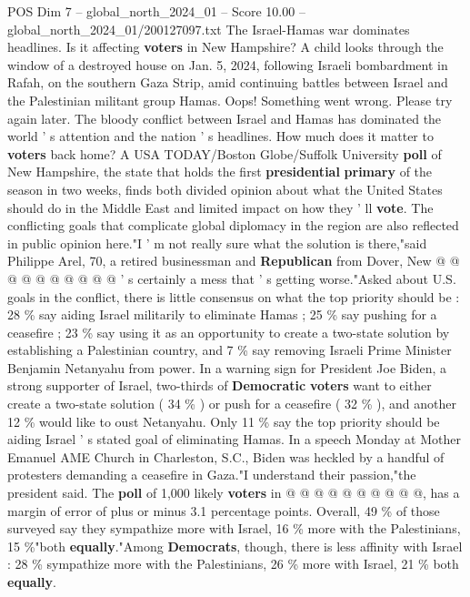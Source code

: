 \begin{textsample}{POS Dim 7 – global\_north\_2024\_01 – Score 10.00 – global\_north\_2024\_01/200127097.txt}  \label{ex:f7_pos_188}
The Israel-Hamas war dominates headlines.
Is it affecting \textbf{voters} in New Hampshire?
A child looks through the window of a destroyed house on Jan. 5, 2024, following Israeli bombardment in Rafah, on the southern Gaza Strip, amid continuing battles between Israel and the Palestinian militant group Hamas.
Oops!
Something went wrong.
Please try again later.
The bloody conflict between Israel and Hamas has dominated the world ' s attention and the nation ' s headlines.
How much does it matter to \textbf{voters} back home?
A USA TODAY/Boston Globe/Suffolk University \textbf{poll} of New Hampshire, the state that holds the first \textbf{presidential} \textbf{primary} of the season in two weeks, finds both divided opinion about what the United States should do in the Middle East and limited impact on how they ' ll \textbf{vote}.
The conflicting goals that complicate global diplomacy in the region are also reflected in public opinion here."I ' m not really sure what the solution is there,"said Philippe Arel, 70, a retired businessman and \textbf{Republican} from Dover, New @ @ @ @ @ @ @ @ @ @ ' s certainly a mess that ' s getting worse."Asked about U.S. goals in the conflict, there is little consensus on what the top priority should be : 28 \% say aiding Israel militarily to eliminate Hamas ; 25 \% say pushing for a ceasefire ; 23 \% say using it as an opportunity to create a two-state solution by establishing a Palestinian country, and 7 \% say removing Israeli Prime Minister Benjamin Netanyahu from power.
In a warning sign for President Joe Biden, a strong supporter of Israel, two-thirds of \textbf{Democratic} \textbf{voters} want to either create a two-state solution ( 34 \% ) or push for a ceasefire ( 32 \% ), and another 12 \% would like to oust Netanyahu.
Only 11 \% say the top priority should be aiding Israel ' s stated goal of eliminating Hamas.
In a speech Monday at Mother Emanuel AME Church in Charleston, S.C., Biden was heckled by a handful of protesters demanding a ceasefire in Gaza."I understand their passion,"the president said.
The \textbf{poll} of 1,000 likely \textbf{voters} in @ @ @ @ @ @ @ @ @ @, has a margin of error of plus or minus 3.1 percentage points.
Overall, 49 \% of those surveyed say they sympathize more with Israel, 16 \% more with the Palestinians, 15 \%"both \textbf{equally}."Among \textbf{Democrats}, though, there is less affinity with Israel : 28 \% sympathize more with the Palestinians, 26 \% more with Israel, 21 \% both \textbf{equally}.

\end{textsample}
